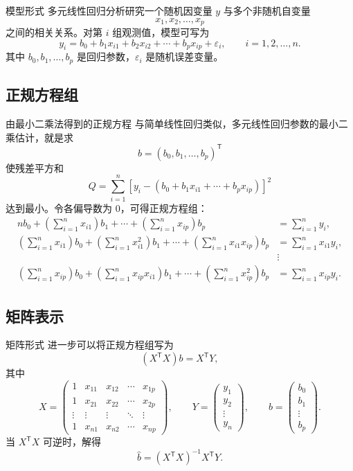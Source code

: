 \documentclass[UTF8,zihao=-4,fontset=fandol]{ctexart}
\begin{document}
\begin{keybox}{模型形式}
多元线性回归分析研究一个随机因变量 $y$ 与多个非随机自变量
\[
x_1,x_2,\ldots,x_p
\]
之间的相关关系。对第 $i$ 组观测值，模型可写为
\[
y_i=b_0+b_1x_{i1}+b_2x_{i2}+\cdots+b_px_{ip}+\varepsilon_i,
\qquad i=1,2,\ldots,n.
\]
其中 $b_0,b_1,\ldots,b_p$ 是回归参数，$\varepsilon_i$ 是随机误差变量。
\end{keybox}

\subsection{正规方程组}

\begin{keybox}{由最小二乘法得到的正规方程}
与简单线性回归类似，多元线性回归参数的最小二乘估计，就是求
\[
b=(b_0,b_1,\ldots,b_p)^{\mathsf T}
\]
使残差平方和
\[
Q=\sum_{i=1}^{n}\left[y_i-\left(b_0+b_1x_{i1}+\cdots+b_px_{ip}\right)\right]^2
\]
达到最小。令各偏导数为 $0$，可得正规方程组：
\[
\begin{aligned}
nb_0+\left(\sum_{i=1}^{n}x_{i1}\right)b_1+\cdots+
\left(\sum_{i=1}^{n}x_{ip}\right)b_p
&=\sum_{i=1}^{n}y_i,\\
\left(\sum_{i=1}^{n}x_{i1}\right)b_0+
\left(\sum_{i=1}^{n}x_{i1}^{2}\right)b_1+\cdots+
\left(\sum_{i=1}^{n}x_{i1}x_{ip}\right)b_p
&=\sum_{i=1}^{n}x_{i1}y_i,\\
&\vdots\\
\left(\sum_{i=1}^{n}x_{ip}\right)b_0+
\left(\sum_{i=1}^{n}x_{ip}x_{i1}\right)b_1+\cdots+
\left(\sum_{i=1}^{n}x_{ip}^{2}\right)b_p
&=\sum_{i=1}^{n}x_{ip}y_i.
\end{aligned}
\]
\end{keybox}

\subsection{矩阵表示}

\begin{keybox}{矩阵形式}
进一步可以将正规方程组写为
\[
(X^{\mathsf T}X)b=X^{\mathsf T}Y,
\]
其中
\[
X=
\begin{pmatrix}
1 & x_{11} & x_{12} & \cdots & x_{1p}\\
1 & x_{21} & x_{22} & \cdots & x_{2p}\\
\vdots & \vdots & \vdots & \ddots & \vdots\\
1 & x_{n1} & x_{n2} & \cdots & x_{np}
\end{pmatrix},
\qquad
Y=
\begin{pmatrix}
y_1\\
y_2\\
\vdots\\
y_n
\end{pmatrix},
\qquad
b=
\begin{pmatrix}
b_0\\
b_1\\
\vdots\\
b_p
\end{pmatrix}.
\]
当 $X^{\mathsf T}X$ 可逆时，解得
\[
\hat{b}=(X^{\mathsf T}X)^{-1}X^{\mathsf T}Y.
\]
\end{keybox}
\end{document}
